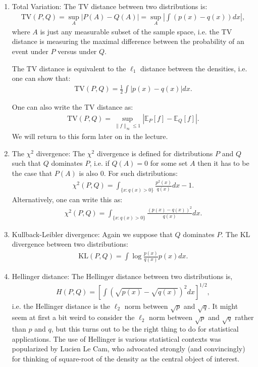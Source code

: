 \documentclass[twoside,12pt]{article}
\begin{document}
\begin{enumerate}
\item Total Variation: The TV distance between two distributions is:
\begin{align*}
\text{TV}(P,Q) = \sup_{A} |P(A) - Q(A)| = \sup_{A} |\int (p(x) - q(x)) dx|,
\end{align*}
where $A$ is just any measurable subset of the sample space, i.e. the TV distance is measuring the maximal difference between the probability of an event under $P$ versus under $Q$.

The TV distance is equivalent to the $\ell_1$ distance between the densities, i.e. one can show that:
\begin{align*}
\text{TV}(P,Q) = \frac{1}{2} \int |p(x) - q(x)| dx. 
\end{align*}

One can also write the TV distance as:
\begin{align*}
\text{TV}(P,Q) = \sup_{\|f\|_{\infty} \leq 1} \left| \mathbb{E}_P [f] - \mathbb{E}_Q [f] \right|.
\end{align*}
We will return to this form later on in the lecture.
\item The $\chi^2$ divergence: The $\chi^2$ divergence is defined for distributions $P$ and $Q$ such that $Q$ dominates $P$, i.e. if $Q(A) = 0$ for some set $A$ then it has to be the case that $P(A)$ is also 0. For such distributions:
\begin{align*}
\chi^2(P,Q) = \int_{\{x: q(x) > 0\}} \frac{p^2(x)}{q(x)}dx - 1.
\end{align*}
Alternatively, one can write this as:
\begin{align*}
\chi^2(P,Q) = \int_{\{x: q(x) > 0\}}  \frac{(p(x) - q(x))^2}{q(x)} dx. 
\end{align*}
\item Kullback-Leibler divergence: Again we suppose that $Q$ dominates $P$. The KL divergence between two distributions:
\begin{align*}
\text{KL}(P,Q) = \int \log \frac{p(x)}{q(x)} p(x) dx.
\end{align*}
\item Hellinger distance: The Hellinger distance between two distributions is,
\begin{align*}
H(P,Q) =\left[ \int ( \sqrt{p(x)} - \sqrt{q(x)})^2 dx\right]^{1/2},
\end{align*}
i.e. the Hellinger distance is the $\ell_2$ norm between $\sqrt{p}$ and $\sqrt{q}$. It might seem at first a bit weird to consider the $\ell_2$ norm between $\sqrt{p}$ and $\sqrt{q}$ rather than $p$ and $q$, but this turns out to be the right thing to do for statistical applications. The use of Hellinger is various statistical contexts was popularized by Lucien Le Cam, who advocated strongly (and convincingly) for thinking of square-root of the density as the central object of interest.


\end{enumerate}
\end{document}

